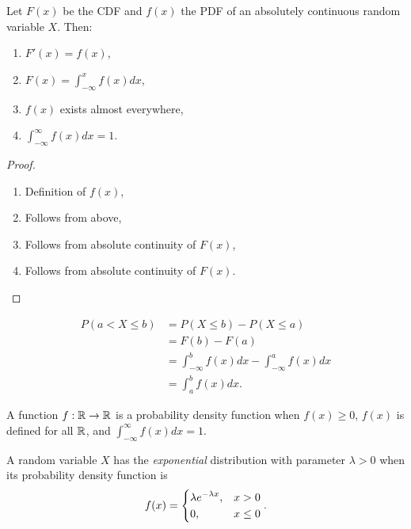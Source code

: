 \begin{thm}
    Let $F(x)$ be the CDF and $f(x)$ the PDF of an absolutely continuous random variable $X$. Then:
    \begin{enumerate}
        \item $F'(x) = f(x)$,
        \item $F(x) = \int_{-\infty}^{x}f(x)dx$,
        \item $f(x)$ exists almost everywhere,
        \item $\int_{-\infty}^{\infty}f(x)dx = 1$.
    \end{enumerate}
\end{thm}

\begin{proof}\proofbreak
    \begin{enumerate}
        \item Definition of $f(x)$,
        \item Follows from above,
        \item Follows from absolute continuity of $F(x)$,
        \item Follows from absolute continuity of $F(x)$.
    \end{enumerate}
\end{proof}

\begin{cor}
    \begin{align*}
        P(a < X \leq b) &= P(X \leq b) - P(X \leq a) \\
        &= F(b) - F(a) \\
        &= \int_{-\infty}^{b}f(x)dx - \int_{-\infty}^{a}f(x)dx \\
        &= \int_{a}^{b}f(x)dx.
    \end{align*}
\end{cor}

\begin{prop}
    A function $f: \mathbb{R} \to \mathbb{R}$ is a probability density function when $f(x) \geq 0$, $f(x)$ is defined for all $\mathbb{R}$, and $\int_{-\infty}^{\infty}f(x)dx = 1$.
\end{prop}

\begin{defn}
    A random variable $X$ has the \emph{exponential} distribution with parameter $\lambda > 0$ when its probability density function is
    \begin{align}
        f(x) = \begin{dcases}
            \lambda e^{-\lambda x}, & x > 0 \\
            0, & x \leq 0
        \end{dcases}.
    \end{align}
\end{defn}

